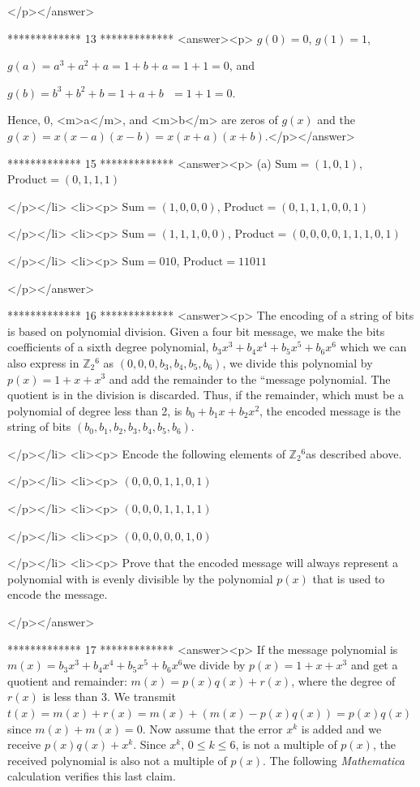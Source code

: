</p></answer>


*************
13
*************
<answer><p>    \(g(0) = 0\), \(g(1) = 1\), 



\(g(a) = a^3 + a^2 + a = 1 + b + a=1+1= 0\), and 



\(g(b) = b^3+b^2 + b = 1 + a + b\text{  }= 1 + 1= 0.\) 



     Hence, 0, <m>a</m>, and <m>b</m> are zeros of \(g(x)\) and the \(g(x) =x(x-a)(x-b) = x(x + a)(x + b)\).</p></answer>


*************
15
*************
<answer><p> (a) \(\text{Sum} = (1,0, 1)\),  \(\text{Product} = (0, 1, 1, 1)\)

</p></li>
<li><p> \(\text{Sum} = (1,0, 0, 0)\), \(\text{Product} = (0, 1, 1, 1, 0, 0, 1)\)

</p></li>
<li><p> \(\text{Sum} = (1, 1, 1, 0, 0)\), \(\text{Product} = (0, 0, 0, 0, 1, 1, 1, 0, 1)\)

</p></li>
<li><p> \(\text{Sum} = 010\),  \(\text{Product} = 11011\)

</p></answer>


*************
16
*************
<answer><p> The encoding of a string of bits is based on polynomial division.  Given a four bit message, we make the bits coefficients of a sixth degree
polynomial,  \(b_3x^3+b_4x^4+b_5x^5+b_6x^6\)  which we can also express in \(\mathbb{Z}_2{}^6\)  as \(\left(0,0,0,b_3,b_4,b_5,b_6\right)\),
we divide this polynomial by \(p(x) =1+x+x^3\) and add the remainder to the {``}message polynomial.  The quotient is in the division is discarded.
 Thus, if the remainder, which must be a polynomial of degree less than 2, is \(b_0+ b_1x+b_2x^2\), the encoded message is the string of bits \(\left(b_0,b_1,b_2,b_3,b_4,b_5,b_6\right)\).

</p></li>
<li><p> Encode the following elements of \(\mathbb{Z}_2{}^6\)as described above.

</p></li>
<li><p>  \((0, 0,0, 1, 1,0, 1)\)

</p></li>
<li><p> \((0, 0, 0, 1,1, 1, 1)\)

</p></li>
<li><p> \(\)\((0, 0,0,0,0,1, 0)\)

</p></li>
<li><p> Prove that the encoded message will always represent a polynomial with is evenly divisible by the polynomial \(p(x)\) that is used to encode
the message.

</p></answer>


*************
17
*************
<answer><p> If the message polynomial is \(m(x) =b_3x^3+b_4x^4+b_5x^5+b_6x^6\)we divide by \(p(x)= 1 + x+x^3\) and get a quotient and remainder:   \(m(x)
= p(x)q(x) + r(x)\), where the degree of \(r(x)\) is less than 3.   We transmit  \(t(x) = m(x) + r(x)= m(x) +(m(x)-p(x)q(x))= p(x)q(x)\)  since
\(m(x)+m(x)=0\).  Now assume that the error \(x^k\) is added and we receive \(p(x)q(x)+x^k\).   Since \(x^k\), \(0\leq k\leq 6\), is not a multiple
of \(p(x)\), the received polynomial is also not a multiple of \(p(x)\).  The following \textit{ Mathematica} calculation verifies this last claim.

